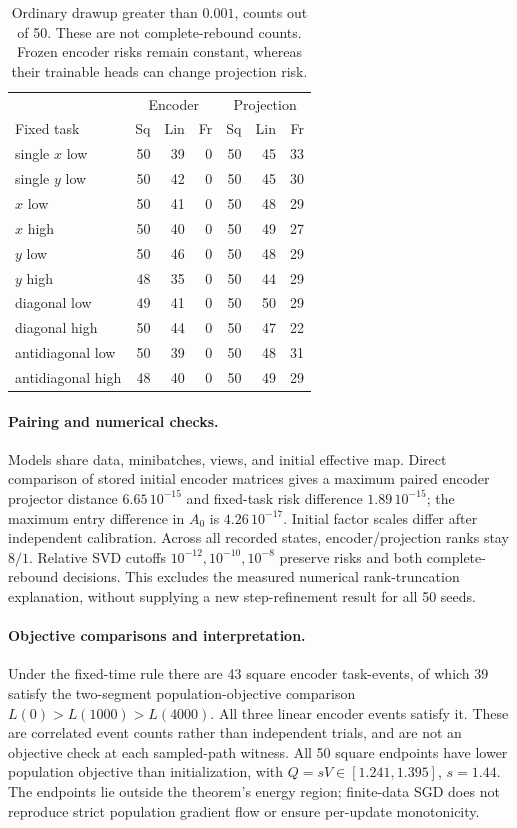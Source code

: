 \begin{table}[t]
\centering\small
\caption{Ordinary drawup greater than $0.001$, counts out of 50. These are not complete-rebound counts. Frozen encoder risks remain constant, whereas their trainable heads can change projection risk.}
\label{supp:fifty-drawup}
\setlength{\tabcolsep}{3pt}
\begin{tabular}{lrrrrrr}
\toprule
&\multicolumn{3}{c}{Encoder}&\multicolumn{3}{c}{Projection}\\
Fixed task&Sq&Lin&Fr&Sq&Lin&Fr\\\midrule
single $x$ low&50&39&0&50&45&33\\
single $y$ low&50&42&0&50&45&30\\
$x$ low&50&41&0&50&48&29\\
$x$ high&50&40&0&50&49&27\\
$y$ low&50&46&0&50&48&29\\
$y$ high&48&35&0&50&44&29\\
diagonal low&49&41&0&50&50&29\\
diagonal high&50&44&0&50&47&22\\
antidiagonal low&50&39&0&50&48&31\\
antidiagonal high&48&40&0&50&49&29\\\bottomrule
\end{tabular}
\end{table}

\paragraph{Pairing and numerical checks.}
Models share data, minibatches, views, and initial effective map. Direct comparison of stored initial encoder matrices gives a maximum paired encoder projector distance $6.65\,10^{-15}$ and fixed-task risk difference $1.89\,10^{-15}$; the maximum entry difference in $A_0$ is $4.26\,10^{-17}$. Initial factor scales differ after independent calibration. Across all recorded states, encoder/projection ranks stay $8/1$. Relative SVD cutoffs $10^{-12},10^{-10},10^{-8}$ preserve risks and both complete-rebound decisions. This excludes the measured numerical rank-truncation explanation, without supplying a new step-refinement result for all 50 seeds.

\paragraph{Objective comparisons and interpretation.}
Under the fixed-time rule there are 43 square encoder task-events, of which 39 satisfy the two-segment population-objective comparison $L(0)>L(1000)>L(4000)$. All three linear encoder events satisfy it. These are correlated event counts rather than independent trials, and are not an objective check at each sampled-path witness. All 50 square endpoints have lower population objective than initialization, with $Q=sV\in[1.241,1.395]$, $s=1.44$. The endpoints lie outside the theorem's energy region; finite-data SGD does not reproduce strict population gradient flow or ensure per-update monotonicity.

